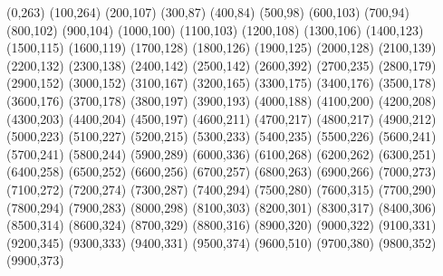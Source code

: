 (0,263)
(100,264)
(200,107)
(300,87)
(400,84)
(500,98)
(600,103)
(700,94)
(800,102)
(900,104)
(1000,100)
(1100,103)
(1200,108)
(1300,106)
(1400,123)
(1500,115)
(1600,119)
(1700,128)
(1800,126)
(1900,125)
(2000,128)
(2100,139)
(2200,132)
(2300,138)
(2400,142)
(2500,142)
(2600,392)
(2700,235)
(2800,179)
(2900,152)
(3000,152)
(3100,167)
(3200,165)
(3300,175)
(3400,176)
(3500,178)
(3600,176)
(3700,178)
(3800,197)
(3900,193)
(4000,188)
(4100,200)
(4200,208)
(4300,203)
(4400,204)
(4500,197)
(4600,211)
(4700,217)
(4800,217)
(4900,212)
(5000,223)
(5100,227)
(5200,215)
(5300,233)
(5400,235)
(5500,226)
(5600,241)
(5700,241)
(5800,244)
(5900,289)
(6000,336)
(6100,268)
(6200,262)
(6300,251)
(6400,258)
(6500,252)
(6600,256)
(6700,257)
(6800,263)
(6900,266)
(7000,273)
(7100,272)
(7200,274)
(7300,287)
(7400,294)
(7500,280)
(7600,315)
(7700,290)
(7800,294)
(7900,283)
(8000,298)
(8100,303)
(8200,301)
(8300,317)
(8400,306)
(8500,314)
(8600,324)
(8700,329)
(8800,316)
(8900,320)
(9000,322)
(9100,331)
(9200,345)
(9300,333)
(9400,331)
(9500,374)
(9600,510)
(9700,380)
(9800,352)
(9900,373)
